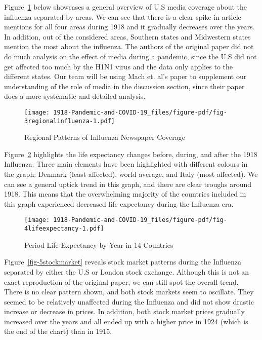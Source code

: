 \documentclass[
]{article}
\begin{document}
Figure~\ref{fig-3regionalinfluenza} below showcases a general overview
of U.S media coverage about the influenza separated by areas. We can see
that there is a clear spike in article mentions for all four areas
during 1918 and it gradually decreases over the years. In addition, out
of the considered areas, Southern states and Midwestern states mention
the most about the influenza. The authors of the original paper did not
do much analysis on the effect of media during a pandemic, since the U.S
did not get affected too much by the H1N1 virus and the data only
applies to the different states. Our team will be using Mach et. al's
paper to supplement our understanding of the role of media in the
discussion section, since their paper does a more systematic and
detailed analysis.

\begin{figure}

{\centering \texttt{[image: 1918-Pandemic-and-COVID-19\_files/figure-pdf/fig-3regionalinfluenza-1.pdf]}

}

\caption{\label{fig-3regionalinfluenza}Regional Patterns of Influenza
Newspaper Coverage}

\end{figure}

Figure~\ref{fig-4lifeexpectancy} highlights the life expectancy changes
before, during, and after the 1918 Influenza. Three main elements have
been highlighted with different colours in the graph: Denmark (least
affected), world average, and Italy (most affected). We can see a
general uptick trend in this graph, and there are clear troughs around
1918. This means that the overwhelming majority of the countries
included in this graph experienced decreased life expectancy during the
Influenza era.

\begin{figure}

{\centering \texttt{[image: 1918-Pandemic-and-COVID-19\_files/figure-pdf/fig-4lifeexpectancy-1.pdf]}

}

\caption{\label{fig-4lifeexpectancy}Period Life Expectancy by Year in 14
Countries}

\end{figure}

Figure~\ref{fig-5stockmarket} reveals stock market patterns during the
Influenza separated by either the U.S or London stock exchange. Although
this is not an exact reproduction of the original paper, we can still
spot the overall trend. There is no clear pattern shown, and both stock
markets seem to oscillate. They seemed to be relatively unaffected
during the Influenza and did not show drastic increase or decrease in
prices. In addition, both stock market prices gradually increased over
the years and all ended up with a higher price in 1924 (which is the end
of the chart) than in 1915.
\end{document}
